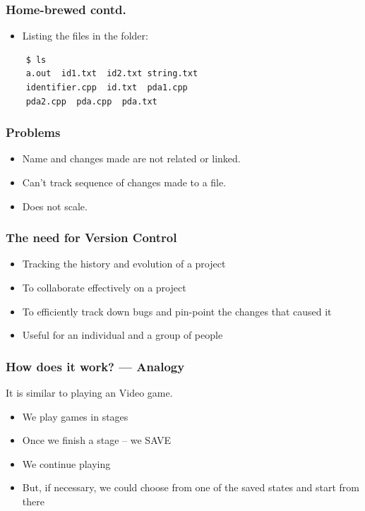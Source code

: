 \documentclass[17pt,compress]{beamer}
\begin{document}
\begin{frame}[fragile]
  \frametitle{Home-brewed contd.}
  \begin{itemize}
  \item Listing the files in the folder:
  \end{itemize}  
  \begin{lstlisting} 
	$ ls
	a.out  id1.txt  id2.txt string.txt
	identifier.cpp  id.txt  pda1.cpp
	pda2.cpp  pda.cpp  pda.txt  
  \end{lstlisting} %
\end{frame}

\begin{frame}[fragile]
  \frametitle{Problems}  
  \begin{block}{}    
  \begin{itemize}
  \item Name and changes made are not related or linked. 
  \item Can't track sequence of changes made to a file. 
  \item Does not scale. 
  \end{itemize}
  \end{block}
\end{frame}

\begin{frame}[fragile]
  \frametitle{The need for Version Control}
  \begin{itemize}
  \item Tracking the history and evolution of a project
  \item To collaborate effectively on a project
  \item To efficiently track down bugs and pin-point the changes that
    caused it 
  \item Useful for an individual and a group of people
  \end{itemize}
\end{frame}

\begin{frame}[fragile]
  \frametitle{How does it work? --- Analogy}
  It is similar to playing an Video game.
  \begin{itemize}
  \item We play games in stages
  \item Once we finish a stage -- \alert{we SAVE}
  \item We continue playing
  \item But, if necessary, we could choose from one of the saved
    states and start from there
  \end{itemize}
\end{frame}
\end{document}
